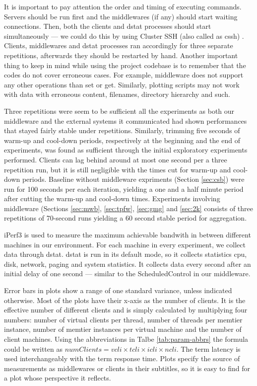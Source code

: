\documentclass[11pt,a4paper]{article}
\begin{document}
\par It is important to pay attention the order and timing of executing commands. Servers should be run first and the middlewares (if any) should start waiting connections. Then, both the clients and dstat processes should start simultaneously — we could do this by using Cluster SSH (also called as cssh) \cite{cssh}. Clients, middlewares and dstat processes ran accordingly for three separate repetitions, afterwards they should be restarted by hand. Another important thing to keep in mind while using the project codebase is to remember that the codes do not cover erroneous cases. For example, middleware does not support any other operations than set or get. Similarly, plotting scripts may not work with data with erroneous content, filenames, directory hierarchy and such.
\\
\par Three repetitions were seem to be sufficient all the experiments as both our middleware and the external systems it communicated had shown performances that stayed fairly stable under repetitions. Similarly, trimming five seconds of warm-up and cool-down periods, respectively at the beginning and the end of experiments, was found as sufficient through the initial exploratory experiments performed. Clients can lag behind around at most one second per a three repetition run, but it is still negligible with the times cut for warm-up and cool-down periods. Baseline without middleware expriments (Section \ref{sec:csb}) were run for 100 seconds per each iteration, yielding a one and a half minute period after cutting the warm-up and cool-down times. Experiments involving middleware (Sections \ref{sec:mwb}, \ref{sec:tpfw}, \ref{sec:gmg} and \ref{sec:2k} consists of three repetitions of 70-second runs yielding a 60 second stable period for aggregation.
\par iPerf3 \cite{iperf} is used to measure the maximum achievable bandwith in between different machines in our environment. For each machine in every experiment, we collect data through dstat. dstat is run in its default mode, so it collects statistics cpu, disk, network, paging and system  statistics. It collects data every second after an initial delay of one second — similar to the ScheduledControl in our middleware.
\\
\par Error bars in plots show a range of one standard variance, unless indicated otherwise. Most of the plots have their x-axis as the number of clients. It is the effective number of different clients and is simply calculated by multiplying four numbers: number of virtual clients per thread, number of threads per memtier instance, number of memtier instances per virtual machine and the number of client machines. Using the abbreviations in Talbe \ref{tab:param-abbrs} the formula could be written as $numClients = vcli \times tcli \times icli \times ncli$. The term latency is used interchangeably with the term response time. Plots specify the source of measurements as middlewares or clients in their subtitles, so it is easy to find for a plot whose perspective it reflects.
\end{document}
